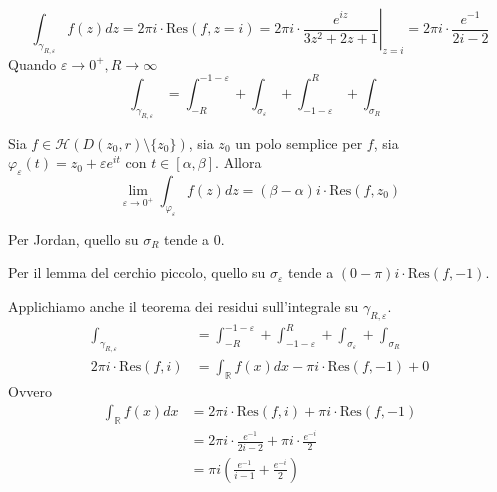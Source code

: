 \begin{equation*}
\int _{\gamma _{R,\varepsilon }} f(z)dz=2\pi i\cdot \mathrm{Res} (f,z=i)=2\pi i\cdotp \left. \frac{e^{iz}}{3z^{2} +2z+1}\right| _{z=i} =2\pi i\cdotp \frac{e^{-1}}{2i-2}
\end{equation*}
Quando $\varepsilon \rightarrow 0^{+} ,R\rightarrow \infty $
\begin{equation*}
\int _{\gamma _{R,\varepsilon }} =\int ^{-1-\varepsilon }_{-R} +\int _{\sigma _{\varepsilon }} +\int ^{R}_{-1-\varepsilon } +\int _{\sigma _{R}}
\end{equation*}
\begin{thm}
 Sia $f\in \mathcal{H}( D( z_{0} ,r) \setminus \{z_{0}\})$, sia $z_{0}$ un polo semplice per $f$, sia $\varphi _{\varepsilon }( t) =z_{0} +\varepsilon e^{it}$ con $t\in [ \alpha ,\beta ]$. Allora
\begin{equation*}
\lim _{\varepsilon \rightarrow 0^{+}}\int _{\varphi _{\varepsilon }} f( z) dz=( \beta -\alpha ) i\cdotp \mathrm{Res}( f,z_{0})
\end{equation*}
\end{thm}
Per Jordan, quello su $\sigma _{R}$ tende a $0$.

Per il lemma del cerchio piccolo, quello su $\sigma _{\varepsilon }$ tende a $( 0-\pi ) i\cdotp \mathrm{Res}( f,-1)$.

Applichiamo anche il teorema dei residui sull'integrale su $\gamma _{R,\varepsilon }$.
\begin{equation*}
\begin{aligned}
\int _{\gamma _{R,\varepsilon }} & =\int ^{-1-\varepsilon }_{-R} +\int ^{R}_{-1-\varepsilon } +\int _{\sigma _{\varepsilon }} +\int _{\sigma _{R}}\\
2\pi i\cdotp \mathrm{Res} (f,i) & =\int _{\mathbb{R}} f( x) dx-\pi i\cdotp \mathrm{Res}( f,-1) +0
\end{aligned}
\end{equation*}
Ovvero
\begin{equation*}
\begin{aligned}
\int _{\mathbb{R}} f( x) dx & =2\pi i\cdotp \mathrm{Res} (f,i)+\pi i\cdotp \mathrm{Res}( f,-1)\\
 & =2\pi i\cdotp \frac{e^{-1}}{2i-2} +\pi i\cdotp \frac{e^{-i}}{2}\\
 & =\pi i\left(\frac{e^{-1}}{i-1} +\frac{e^{-i}}{2}\right)
\end{aligned}
\end{equation*}
\Soluzione

